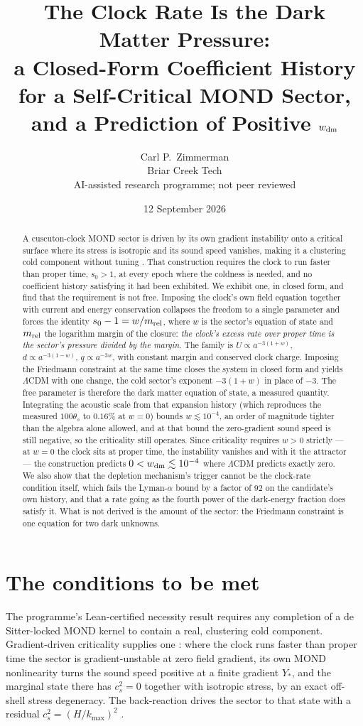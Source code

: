 \documentclass[11pt,letterpaper]{article}
\title{The Clock Rate Is the Dark Matter Pressure:\\ a Closed-Form Coefficient History for a Self-Critical MOND Sector,\\ and a Prediction of Positive $w_{\rm dm}$}
\author{Carl P.\ Zimmerman\\ \small Briar Creek Tech\\ \small AI-assisted research programme; not peer reviewed}
\date{12 September 2026}
\begin{document}
\maketitle
\begin{abstract}
A cuscuton-clock MOND sector is driven by its own gradient instability onto a critical surface where its stress is isotropic and its sound speed vanishes, making it a clustering cold component without tuning \cite{paper19,paper20}. That construction requires the clock to run faster than proper time, $s_0>1$, at every epoch where the coldness is needed, and no coefficient history satisfying it had been exhibited. We exhibit one, in closed form, and find that the requirement is not free. Imposing the clock's own field equation together with current and energy conservation collapses the freedom to a single parameter and forces the identity $s_0-1=w/m_{\rm rel}$, where $w$ is the sector's equation of state and $m_{\rm rel}$ the logarithm margin of the closure: \emph{the clock's excess rate over proper time is the sector's pressure divided by the margin}. The family is $U\propto a^{-3(1+w)}$, $d\propto a^{-3(1-w)}$, $q\propto a^{-3w}$, with constant margin and conserved clock charge. Imposing the Friedmann constraint at the same time closes the system in closed form and yields $\Lambda$CDM with one change, the cold sector's exponent $-3(1+w)$ in place of $-3$. The free parameter is therefore the dark matter equation of state, a measured quantity. Integrating the acoustic scale from that expansion history (which reproduces the measured $100\theta_s$ to $0.16\%$ at $w=0$) bounds $w\lesssim10^{-4}$, an order of magnitude tighter than the algebra alone allowed, and at that bound the zero-gradient sound speed is still negative, so the criticality still operates. Since criticality requires $w>0$ strictly --- at $w=0$ the clock sits at proper time, the instability vanishes and with it the attractor --- the construction predicts $0<w_{\rm dm}\lesssim10^{-4}$ where $\Lambda$CDM predicts exactly zero. We also show that the depletion mechanism's trigger cannot be the clock-rate condition itself, which fails the Lyman-$\alpha$ bound by a factor of 92 on the candidate's own history, and that a rate going as the fourth power of the dark-energy fraction does satisfy it. What is not derived is the amount of the sector: the Friedmann constraint is one equation for two dark unknowns.
\end{abstract}

\section{The conditions to be met}
The programme's Lean-certified necessity result \cite{repo} requires any completion of a de Sitter-locked MOND kernel to contain a real, clustering cold component. Gradient-driven criticality supplies one \cite{paper19}: where the clock runs faster than proper time the sector is gradient-unstable at zero field gradient, its own MOND nonlinearity turns the sound speed positive at a finite gradient $Y_*$, and the marginal state there has $c_s^2=0$ together with isotropic stress, by an exact off-shell stress degeneracy. The back-reaction drives the sector to that state with a residual $c_s^2=(H/k_{\max})^2$ \cite{paper20}.
\end{document}
